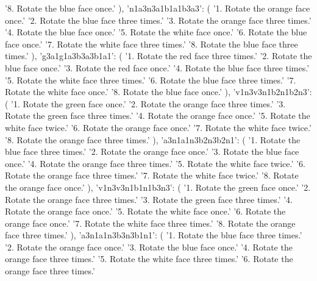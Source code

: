 {{            '8. Rotate the blue face once.'
        ),
        'n1a3n3a1b1a1b3a3': (
            '1. Rotate the orange face once.\n'
            '2. Rotate the blue face three times.\n'
            '3. Rotate the orange face three times.\n'
            '4. Rotate the blue face once.\n'
            '5. Rotate the white face once.\n'
            '6. Rotate the blue face once.\n'
            '7. Rotate the white face three times.\n'
            '8. Rotate the blue face three times.'
        ),
        'g3a1g1a3b3a3b1a1': (
            '1. Rotate the red face three times.\n'
            '2. Rotate the blue face once.\n'
            '3. Rotate the red face once.\n'
            '4. Rotate the blue face three times.\n'
            '5. Rotate the white face three times.\n'
            '6. Rotate the blue face three times.\n'
            '7. Rotate the white face once.\n'
            '8. Rotate the blue face once.'
        ),
        'v1n3v3n1b2n1b2n3': (
            '1. Rotate the green face once.\n'
            '2. Rotate the orange face three times.\n'
            '3. Rotate the green face three times.\n'
            '4. Rotate the orange face once.\n'
            '5. Rotate the white face twice.\n'
            '6. Rotate the orange face once.\n'
            '7. Rotate the white face twice.\n'
            '8. Rotate the orange face three times.'
        ),
        'a3n1a1n3b2n3b2n1': (
            '1. Rotate the blue face three times.\n'
            '2. Rotate the orange face once.\n'
            '3. Rotate the blue face once.\n'
            '4. Rotate the orange face three times.\n'
            '5. Rotate the white face twice.\n'
            '6. Rotate the orange face three times.\n'
            '7. Rotate the white face twice.\n'
            '8. Rotate the orange face once.'
        ),
        'v1n3v3n1b1n1b3n3': (
            '1. Rotate the green face once.\n'
            '2. Rotate the orange face three times.\n'
            '3. Rotate the green face three times.\n'
            '4. Rotate the orange face once.\n'
            '5. Rotate the white face once.\n'
            '6. Rotate the orange face once.\n'
            '7. Rotate the white face three times.\n'
            '8. Rotate the orange face three times.'
        ),
        'a3n1a1n3b3n3b1n1': (
            '1. Rotate the blue face three times.\n'
            '2. Rotate the orange face once.\n'
            '3. Rotate the blue face once.\n'
            '4. Rotate the orange face three times.\n'
            '5. Rotate the white face three times.\n'
            '6. Rotate the orange face three times.\n'
}}
